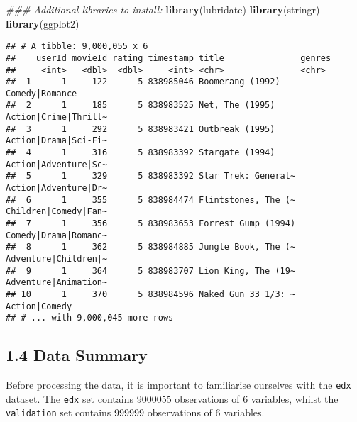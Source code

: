 \documentclass[]{article}
\newenvironment{Shaded}{\begin{snugshade}}{\end{snugshade}}
\newcommand{\CommentTok}[1]{\textcolor[rgb]{0.56,0.35,0.01}{\textit{#1}}}
\newcommand{\KeywordTok}[1]{\textcolor[rgb]{0.13,0.29,0.53}{\textbf{#1}}}
\newcommand{\NormalTok}[1]{#1}
\newcommand{\OperatorTok}[1]{\textcolor[rgb]{0.81,0.36,0.00}{\textbf{#1}}}
\begin{document}
\begin{Shaded}
\begin{Highlighting}[]
\CommentTok{### Additional libraries to install:}
\KeywordTok{library}\NormalTok{(lubridate)}
\KeywordTok{library}\NormalTok{(stringr)}
\KeywordTok{library}\NormalTok{(ggplot2)}
\end{Highlighting}
\end{Shaded}

\begin{Shaded}
\end{Shaded}

\begin{verbatim}
## # A tibble: 9,000,055 x 6
##    userId movieId rating timestamp title               genres              
##     <int>   <dbl>  <dbl>     <int> <chr>               <chr>               
##  1      1     122      5 838985046 Boomerang (1992)    Comedy|Romance      
##  2      1     185      5 838983525 Net, The (1995)     Action|Crime|Thrill~
##  3      1     292      5 838983421 Outbreak (1995)     Action|Drama|Sci-Fi~
##  4      1     316      5 838983392 Stargate (1994)     Action|Adventure|Sc~
##  5      1     329      5 838983392 Star Trek: Generat~ Action|Adventure|Dr~
##  6      1     355      5 838984474 Flintstones, The (~ Children|Comedy|Fan~
##  7      1     356      5 838983653 Forrest Gump (1994) Comedy|Drama|Romanc~
##  8      1     362      5 838984885 Jungle Book, The (~ Adventure|Children|~
##  9      1     364      5 838983707 Lion King, The (19~ Adventure|Animation~
## 10      1     370      5 838984596 Naked Gun 33 1/3: ~ Action|Comedy       
## # ... with 9,000,045 more rows
\end{verbatim}

\hypertarget{data-summary-1}{%
\subsection{1.4 Data Summary}\label{data-summary-1}}

Before processing the data, it is important to familiarise ourselves
with the \texttt{edx} dataset. The \texttt{edx} set contains 9000055
observations of 6 variables, whilst the \texttt{validation} set contains
999999 observations of 6 variables.
\end{document}
